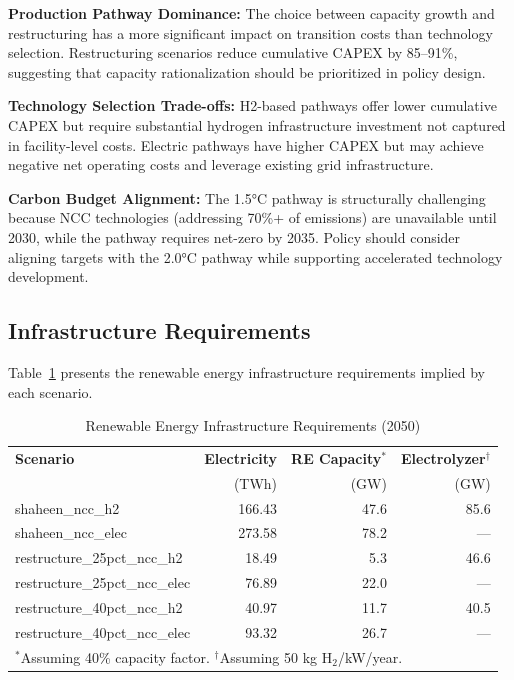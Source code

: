 \documentclass[12pt,a4paper]{article}
\begin{document}
\textbf{Production Pathway Dominance:} The choice between capacity growth and restructuring has a more significant impact on transition costs than technology selection. Restructuring scenarios reduce cumulative CAPEX by 85--91\%, suggesting that capacity rationalization should be prioritized in policy design.

\textbf{Technology Selection Trade-offs:} H2-based pathways offer lower cumulative CAPEX but require substantial hydrogen infrastructure investment not captured in facility-level costs. Electric pathways have higher CAPEX but may achieve negative net operating costs and leverage existing grid infrastructure.

\textbf{Carbon Budget Alignment:} The 1.5°C pathway is structurally challenging because NCC technologies (addressing 70\%+ of emissions) are unavailable until 2030, while the pathway requires net-zero by 2035. Policy should consider aligning targets with the 2.0°C pathway while supporting accelerated technology development.

\subsection{Infrastructure Requirements}

Table~\ref{tab:infrastructure} presents the renewable energy infrastructure requirements implied by each scenario.

\begin{table}[H]
\centering
\caption{Renewable Energy Infrastructure Requirements (2050)}
\label{tab:infrastructure}
\begin{tabular}{@{}lrrr@{}}
\toprule
\textbf{Scenario} & \textbf{Electricity} & \textbf{RE Capacity}$^*$ & \textbf{Electrolyzer}$^\dagger$ \\
 & (TWh) & (GW) & (GW) \\
\midrule
shaheen\_ncc\_h2 & 166.43 & 47.6 & 85.6 \\
shaheen\_ncc\_elec & 273.58 & 78.2 & --- \\
restructure\_25pct\_ncc\_h2 & 18.49 & 5.3 & 46.6 \\
restructure\_25pct\_ncc\_elec & 76.89 & 22.0 & --- \\
restructure\_40pct\_ncc\_h2 & 40.97 & 11.7 & 40.5 \\
restructure\_40pct\_ncc\_elec & 93.32 & 26.7 & --- \\
\bottomrule
\multicolumn{4}{l}{\footnotesize $^*$Assuming 40\% capacity factor. $^\dagger$Assuming 50 kg H$_2$/kW/year.}
\end{tabular}
\end{table}
\end{document}
